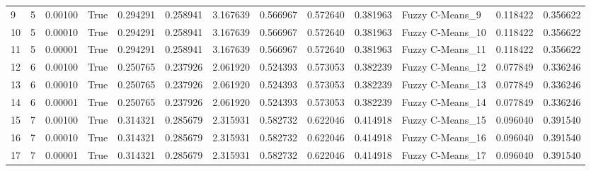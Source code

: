 \begin{tabular}{llrlrrrrrrlrr}
9  &          5 &    0.00100 &  True &             0.294291 &            0.258941 &              3.167639 &               0.566967 &           0.572640 &           0.381963 &   Fuzzy C-Means\_9 &          0.118422 &         0.356622 \\
10 &          5 &    0.00010 &  True &             0.294291 &            0.258941 &              3.167639 &               0.566967 &           0.572640 &           0.381963 &  Fuzzy C-Means\_10 &          0.118422 &         0.356622 \\
11 &          5 &    0.00001 &  True &             0.294291 &            0.258941 &              3.167639 &               0.566967 &           0.572640 &           0.381963 &  Fuzzy C-Means\_11 &          0.118422 &         0.356622 \\
12 &          6 &    0.00100 &  True &             0.250765 &            0.237926 &              2.061920 &               0.524393 &           0.573053 &           0.382239 &  Fuzzy C-Means\_12 &          0.077849 &         0.336246 \\
13 &          6 &    0.00010 &  True &             0.250765 &            0.237926 &              2.061920 &               0.524393 &           0.573053 &           0.382239 &  Fuzzy C-Means\_13 &          0.077849 &         0.336246 \\
14 &          6 &    0.00001 &  True &             0.250765 &            0.237926 &              2.061920 &               0.524393 &           0.573053 &           0.382239 &  Fuzzy C-Means\_14 &          0.077849 &         0.336246 \\
15 &          7 &    0.00100 &  True &             0.314321 &            0.285679 &              2.315931 &               0.582732 &           0.622046 &           0.414918 &  Fuzzy C-Means\_15 &          0.096040 &         0.391540 \\
16 &          7 &    0.00010 &  True &             0.314321 &            0.285679 &              2.315931 &               0.582732 &           0.622046 &           0.414918 &  Fuzzy C-Means\_16 &          0.096040 &         0.391540 \\
17 &          7 &    0.00001 &  True &             0.314321 &            0.285679 &              2.315931 &               0.582732 &           0.622046 &           0.414918 &  Fuzzy C-Means\_17 &          0.096040 &         0.391540 \\
\bottomrule
\end{tabular}
